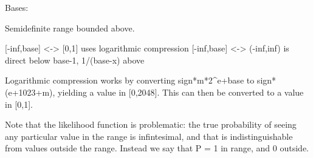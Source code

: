 \documentclass[letterpaper,10pt,english]{sphinxmanual}
\begin{document}
\begin{fulllineitems}
\label{api/mystic.bounds:refl1d.mystic.bounds.BoundedAbove}
Bases: 

Semidefinite range bounded above.

{[}-inf,base{]} \textless{}-\textgreater{} {[}0,1{]} uses logarithmic compression
{[}-inf,base{]} \textless{}-\textgreater{} (-inf,inf) is direct below base-1, 1/(base-x) above

Logarithmic compression works by converting sign*m*2\textasciicircum{}e+base to
sign*(e+1023+m), yielding a value in {[}0,2048{]}.  This can then be
converted to a value in {[}0,1{]}.

Note that the likelihood function is problematic: the true probability
of seeing any particular value in the range is infintesimal, and that
is indistinguishable from values outside the range.    Instead we say
that P = 1 in range, and 0 outside.

\begin{fulllineitems}
\label{api/mystic.bounds:refl1d.mystic.bounds.BoundedAbove.get01}
\end{fulllineitems}


\begin{fulllineitems}
\label{api/mystic.bounds:refl1d.mystic.bounds.BoundedAbove.getfull}
\end{fulllineitems}


\begin{fulllineitems}
\label{api/mystic.bounds:refl1d.mystic.bounds.BoundedAbove.nllf}
\end{fulllineitems}


\begin{fulllineitems}
\label{api/mystic.bounds:refl1d.mystic.bounds.BoundedAbove.put01}
\end{fulllineitems}


\end{fulllineitems}
\end{document}
